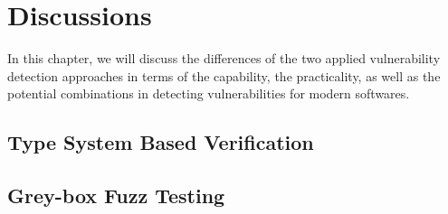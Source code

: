 
\chapter{Discussions} \label{Chapter9}
In this chapter, we will discuss the differences of the two applied vulnerability detection approaches in terms of the capability, the practicality, as well as the potential combinations in detecting vulnerabilities for modern softwares.

\section{Type System Based Verification}

\section{Grey-box Fuzz Testing}
